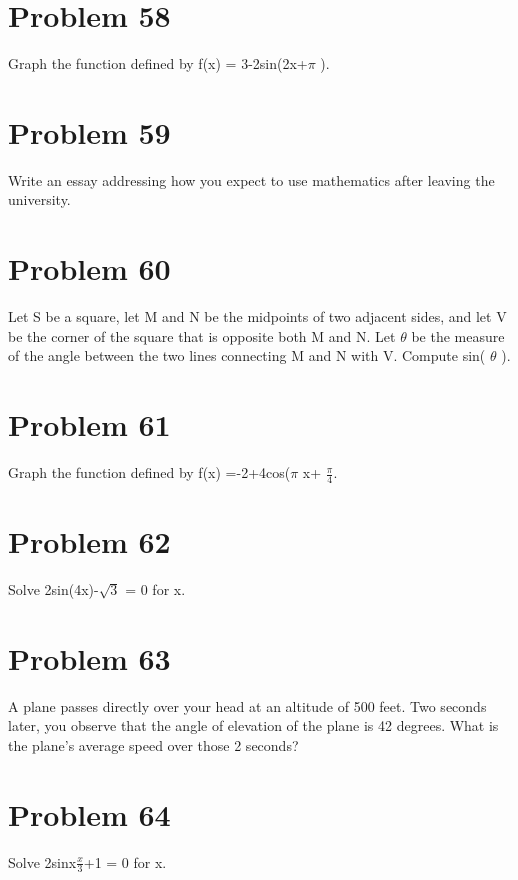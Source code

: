 \documentclass[11pt]{article} %
\begin{document}
\newpage \section*{Problem 58} Graph the function defined by f(x) = 3-2sin(2x+$\pi$ ).
\newpage \section*{Problem 59} Write an essay addressing how you expect to use mathematics after leaving the university.
\newpage \section*{Problem 60} Let S be a square, let M and N be the midpoints of two adjacent sides, and let V be the corner of the square that is opposite both M and N. Let $\theta$ be the measure of the angle between the two lines connecting M and N with V. Compute sin( $\theta$ ). 
\newpage \section*{Problem 61} Graph the function defined by f(x) =-2+4cos($\pi$ x+ $\frac{\pi}{4}$. 
\newpage \section*{Problem 62} Solve 2sin(4x)-$\sqrt{3}$ = 0 for x.
\newpage \section*{Problem 63} A plane passes directly over your head at an altitude of 500 feet. Two seconds later, you observe that the angle of elevation of the plane is 42 degrees. What is the plane’s average speed over those 2 seconds? 
\newpage  \section*{Problem 64} Solve 2sinx$\frac{x}{3}$+1 = 0 for x.
\end{document}

